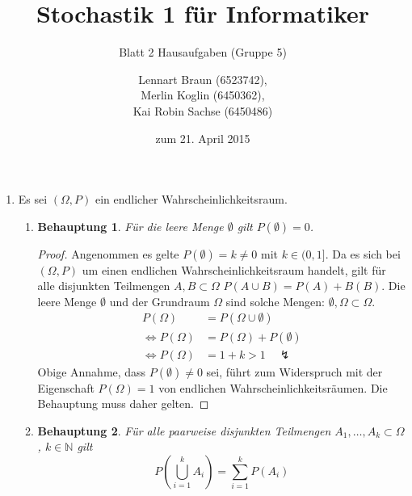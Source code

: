 \documentclass[a4paper]{scrartcl}
\title{Stochastik 1 für Informatiker}
\subtitle{Blatt 2 Hausaufgaben (Gruppe 5)}
\author{
    Lennart Braun (6523742), \\
    Merlin Koglin (6450362), \\
    Kai Robin Sachse (6450486)
}
\date{zum 21. April 2015}
\newtheorem*{behaupt}{Behauptung}
\newcommand{\gdw}{\Leftrightarrow}
\begin{document}
\maketitle

\begin{enumerate}[label=\bfseries\arabic*.]
    \item Es sei $(\Omega, P)$ ein endlicher Wahrscheinlichkeitsraum.
        \begin{enumerate}[label=(\roman*)]
            \item
                \begin{behaupt}
                    Für die leere Menge $\emptyset$ gilt $P(\emptyset) = 0$.
                \end{behaupt}
                \begin{proof}
                    Angenommen es gelte $P(\emptyset) = k \neq 0$ mit
                    $k \in (0, 1]$.
                    Da es sich bei $(\Omega, P)$ um einen endlichen
                    Wahrscheinlichkeitsraum handelt, gilt für alle disjunkten
                    Teilmengen $A, B \subset \Omega$
                    $P(A \cup B) = P(A) + B(B)$.
                    Die leere Menge $\emptyset$ und der Grundraum $\Omega$ sind
                    solche Mengen: $\emptyset, \Omega \subset \Omega$.
                    \begin{equation}
                        \begin{split}
                            P(\Omega) &= P(\Omega \cup \emptyset) \\
                            \gdw P(\Omega) &= P(\Omega) + P(\emptyset) \\
                            \gdw P(\Omega) &= 1 + k > 1 \quad \lightning
                        \end{split}
                    \end{equation}
                    Obige Annahme, dass $P(\emptyset) \neq 0$ sei, führt zum
                    Widerspruch mit der Eigenschaft $P(\Omega) = 1$ von
                    endlichen Wahrscheinlichkeitsräumen.
                    Die Behauptung muss daher gelten.
                \end{proof}
            \clearpage

            \item
                \begin{behaupt}
                    Für alle paarweise disjunkten Teilmengen
                    $A_1, \ldots, A_k \subset \Omega$, $k \in \mathbb{N}$ gilt
                    \begin{equation*}
                        P \left( \bigcup_{i=1}^k A_i \right)
                        = \sum_{i=1}^k P(A_i)
                    \end{equation*}
                    

\end{behaupt}
\end{enumerate}
\end{enumerate}
\end{document}
